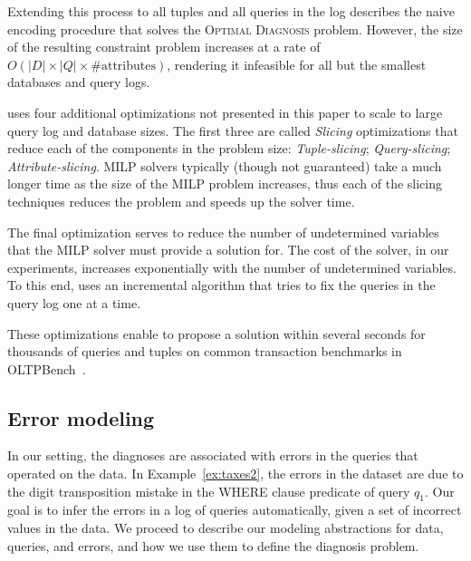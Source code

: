 Extending this process to all tuples and all queries in the log 
describes the naive encoding procedure that solves the
\textsc{Optimal Diagnosis} problem.
However, the size of the resulting constraint problem increases 
at a rate of $O(|D|\times |Q|\times \mathrm{\#attributes})$, rendering
it infeasible for all but the smallest databases and query logs.


\sys uses four additional optimizations not presented in this paper 
to scale to large query log and database sizes.  The first three are
called {\it Slicing} optimizations that reduce each of the components in the problem size:
{\it Tuple-slicing}; {\it Query-slicing}; {\it Attribute-slicing}. 
MILP solvers typically (though not guaranteed) take a much longer time as the size of the MILP problem increases, thus
each of the slicing techniques reduces the problem and speeds up the solver time.

The final optimization serves to reduce the number of undetermined variables that the MILP solver must
provide a solution for.  The cost of the solver, in our experiments, increases exponentially with the number of 
undetermined variables.  To this end, \sys uses an incremental algorithm that tries to fix the queries in the query
log one at a time.

These optimizations enable \sys to propose a solution within several seconds for thousands of 
queries and tuples on common transaction benchmarks in OLTPBench~\cite{oltpbench}.


















% 

\subsection{Error modeling}
\label{sec:model}

In our setting, the diagnoses are associated with errors in the queries that
operated on the data. In Example~\ref{ex:taxes2}, the errors in the dataset
are due to the digit transposition mistake in the WHERE clause predicate of
query $q_1$. Our goal is to infer the errors in a log of queries
automatically, given a set of incorrect values in the data. We proceed to
describe our modeling abstractions for data, queries, and errors, and how we
use them to define the diagnosis problem.

